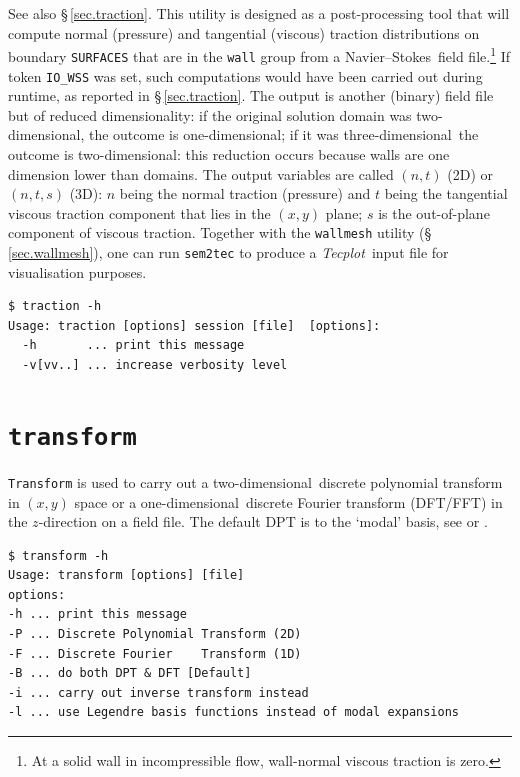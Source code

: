 \documentclass[11pt]{report}
\newcommand{\Tecplot}{\emph{Tecplot}}
\newcommand\oned{one-di\-men\-sion\-al}
\newcommand\twod{two-di\-men\-sion\-al}
\newcommand\threed{three-di\-men\-sion\-al}
\newcommand\NavSto{Navier--Stokes}
\begin{document}
See also \S\,\ref{sec.traction}.  This utility is designed as a
post-processing tool that will compute normal (pressure) and
tangential (viscous) traction distributions on boundary
\verb|SURFACES| that are in the \verb|wall| group from a
\NavSto\ field file.\footnote{At a solid wall in incompressible flow,
  wall-normal viscous traction is zero.}  If token \verb|IO_WSS| was
set, such computations would have been carried out during runtime, as
reported in \S\,\ref{sec.traction}.  The output is another (binary)
field file but of reduced dimensionality: if the original solution
domain was \twod, the outcome is \oned; if it was \threed\, the
outcome is \twod: this reduction occurs because walls are one
dimension lower than domains. The output variables are called $(n,t)$
(2D) or $(n,t,s)$ (3D): $n$ being the normal traction (\ie pressure)
and $t$ being the tangential viscous traction component that lies in
the $(x,y)$ plane; $s$ is the out-of-plane component of viscous
traction.  Together with the \verb|wallmesh| utility
(\S\,\ref{sec.wallmesh}), one can run \verb|sem2tec| to produce a
\Tecplot\ input file for visualisation purposes.
%
{\small
\begin{verbatim}
$ traction -h
Usage: traction [options] session [file]  [options]:
  -h       ... print this message
  -v[vv..] ... increase verbosity level
\end{verbatim}
}
%

\section{\texttt{transform}}
\label{sec.transform}

\verb|Transform| is used to carry out a \twod\ discrete polynomial
transform \citep[DPT,][]{boyd01,blsc03} in $(x,y)$ space or a
\oned\ discrete Fourier transform (DFT/FFT) in the $z$-direction on a
field file.  The default DPT is to the `modal' basis, see
\citet{kars05} or \citet{blsc03}.
%
{\small
\begin{verbatim}
$ transform -h
Usage: transform [options] [file]
options:
-h ... print this message
-P ... Discrete Polynomial Transform (2D)
-F ... Discrete Fourier    Transform (1D)
-B ... do both DPT & DFT [Default]
-i ... carry out inverse transform instead
-l ... use Legendre basis functions instead of modal expansions
\end{verbatim}
}
%

\end{document}
